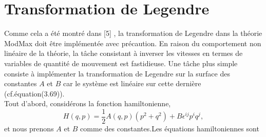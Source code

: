 \documentclass[12pt,a4paper, openany]{report}
\begin{document}
	\section{Transformation de Legendre}
	Comme cela a été montré dans [5] , la transformation de Legendre dans la théorie ModMax doit \^{e}tre implémentée avec précaution. En raison du comportement non linéaire de la théorie, la t\^{a}che consistant à inverser les vitesses en termes de variables de quantité de mouvement est fastidieuse. Une t\^{a}che plus simple consiste à implémenter la transformation de Legendre sur la surface des constantes $A$ et $B$ car le système est linéaire sur cette dernière (cf.équation(3.69)).\\ Tout d'abord, considérons la fonction hamiltonienne,
	\begin{equation}
		H(q,p)=\frac{1}{2}A(q,p)\left(p^2+q^2\right)+B\epsilon^{ij}p^iq^j ,
	\end{equation} et nous prenons $A$ et $B$ comme des constantes.Les équations hamiltoniennes sont 
	
\end{document}
